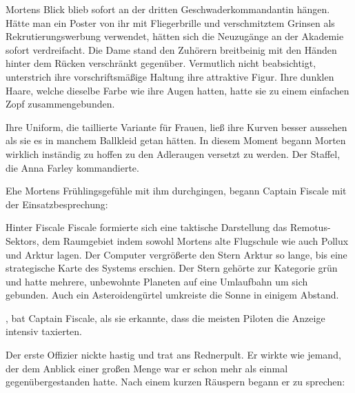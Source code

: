 \par

Mortens Blick blieb sofort an der dritten Geschwaderkommandantin hängen. Hätte man ein Poster von ihr mit Fliegerbrille und verschmitztem Grinsen als Rekrutierungswerbung verwendet, hätten sich die Neuzugänge an der Akademie sofort verdreifacht. Die Dame stand den Zuhörern breitbeinig mit den Händen hinter dem Rücken verschränkt gegenüber. Vermutlich nicht beabsichtigt, unterstrich ihre vorschriftsmäßige Haltung ihre attraktive Figur. Ihre dunklen Haare, welche dieselbe Farbe wie ihre Augen hatten, hatte sie zu einem einfachen Zopf zusammengebunden.

\par

Ihre Uniform, die taillierte Variante für Frauen, ließ ihre Kurven besser aussehen als sie es in manchem Ballkleid getan hätten. In diesem Moment begann Morten wirklich inständig zu hoffen zu den Adleraugen versetzt zu werden. Der Staffel, die Anna Farley kommandierte.

\par

Ehe Mortens Frühlingsgefühle mit ihm durchgingen, begann Captain Fiscale mit der Einsatzbesprechung: 

\par

Hinter Fiscale Fiscale formierte sich eine taktische Darstellung das Remotus-Sektors, dem Raumgebiet indem sowohl Mortens alte Flugschule wie auch Pollux und Arktur lagen. Der Computer vergrößerte den Stern Arktur so lange, bis eine strategische Karte des Systems erschien. Der Stern gehörte zur Kategorie grün und hatte mehrere, unbewohnte Planeten auf eine Umlaufbahn um sich gebunden. Auch ein Asteroidengürtel umkreiste die Sonne in einigem Abstand.

\par

, bat Captain Fiscale, als sie erkannte, dass die meisten Piloten die Anzeige intensiv taxierten. 

\par

Der erste Offizier nickte hastig und trat ans Rednerpult. Er wirkte wie jemand, der dem Anblick einer großen Menge war er schon mehr als einmal gegenübergestanden hatte. Nach einem kurzen Räuspern begann er zu sprechen: 

